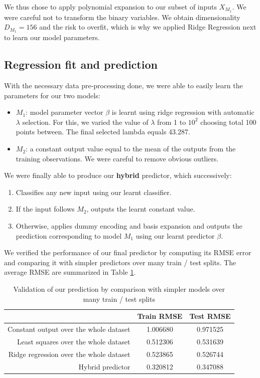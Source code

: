 \documentclass{article} %
\begin{document}
  We thus chose to apply polynomial expansion to our subset of inputs $X_{M_1}$. We were careful not to transform the binary variables. We obtain dimensionality $D_{M_1} = 156$ and the risk to overfit, which is why we applied Ridge Regression next to learn our model parameters.

  \subsection{Regression fit and prediction}
  With the necessary data pre-processing done, we were able to easily learn the parameters for our two models:
  \begin{itemize}
    \item $M_1$: model parameter vector $\beta$ is learnt using ridge regression with automatic $\lambda$ selection. For this, we varied the value of $\lambda$ from 1 to $10^2$ choosing total 100 points between. The final selected lambda equals 43.287.
    \item $M_2$: a constant output value equal to the mean of the outputs from the training observations. We were careful to remove obvious outliers.
  \end{itemize}

  We were finally able to produce our \textbf{hybrid} predictor, which successively:
  \begin{enumerate}
    \item Classifies any new input using our learnt classifier.
    \item If the input follows $M_2$, outputs the learnt constant value.
    \item Otherwise, applies dummy encoding and basis expansion and outputs the prediction corresponding to model $M_1$ using our learnt predictor $\beta$.
  \end{enumerate}

  We verified the performance of our final predictor by computing its RMSE error and comparing it with simpler predictors over many train / test splits. The average RMSE are summarized in Table \ref{predictorValidation}.

  \begin{table}[h]
    \center
    \begin{tabular}{|r|c|c|}
      \hline
                                              & Train RMSE & Test RMSE \\
      \hline
      Constant output over the whole dataset  & 1.006680   & 0.971525 \\
      \hline
      Least squares over the whole dataset    & 0.512306   & 0.531639 \\
      \hline
      Ridge regression over the whole dataset & 0.523865   & 0.526744 \\
      \hline
      Hybrid predictor                        & 0.320812   & 0.347088 \\
      \hline
    \end{tabular}
    \caption{Validation of our prediction by comparison with simpler models over many train / test splits}
    \label{predictorValidation}
  \end{table}
\end{document}
